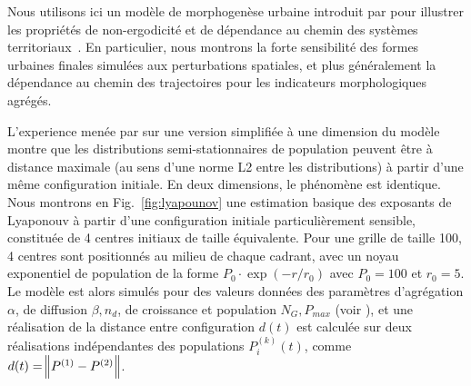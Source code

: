 \documentclass[11pt]{article}
\begin{document}
Nous utilisons ici un modèle de morphogenèse urbaine introduit par \cite{raimbault2018calibration} pour illustrer les propriétés de non-ergodicité et de dépendance au chemin des systèmes territoriaux~\citep{pumain2012urban}. En particulier, nous montrons la forte sensibilité des formes urbaines finales simulées aux perturbations spatiales, et plus généralement la dépendance au chemin des trajectoires pour les indicateurs morphologiques agrégés.

L'experience menée par \cite{raimbault2018calibration} sur une version simplifiée à une dimension du modèle montre que les distributions semi-stationnaires de population peuvent être à distance maximale (au sens d'une norme L2 entre les distributions) à partir d'une même configuration initiale. En deux dimensions, le phénomène est identique. Nous montrons en Fig.~\ref{fig:lyapounov} une estimation basique des exposants de Lyaponouv à partir d'une configuration initiale particulièrement sensible, constituée de 4 centres initiaux de taille équivalente. Pour une grille de taille 100, 4 centres sont positionnés au milieu de chaque cadrant, avec un noyau exponentiel de population de la forme $P_0 \cdot \exp \left(-r/r_0\right)$ avec $P_0 = 100$ et $r_0 = 5$. Le modèle est alors simulés pour des valeurs données des paramètres d'agrégation $\alpha$, de diffusion $\beta, n_d$, de croissance et population $N_G, P_{max}$ (voir \cite{raimbault2018calibration}), et une réalisation de la distance entre configuration $d(t)$ est calculée sur deux réalisations indépendantes des populations $P^{(k)}_i(t)$, comme $d(t)=\norm{P^{(1)} - P^{(2)}}$. 



\end{document}
